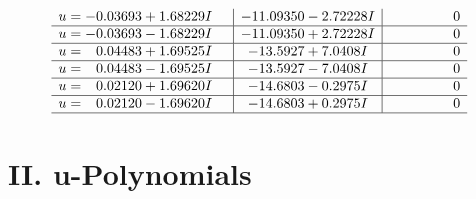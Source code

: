 \documentclass[1p]{elsarticle_modified}
\theoremstyle{definition}
\begin{document}
$$\begin{array}{c|c|c}
\begin{aligned}
u &= -0.03693 + 1.68229 I\end{aligned}
 & -11.09350 - 2.72228 I & \phantom{-0.000000 } 0 \\ \hline\begin{aligned}
u &= -0.03693 - 1.68229 I\end{aligned}
 & -11.09350 + 2.72228 I & \phantom{-0.000000 } 0 \\ \hline\begin{aligned}
u &= \phantom{-}0.04483 + 1.69525 I\end{aligned}
 & -13.5927 + 7.0408 I & \phantom{-0.000000 } 0 \\ \hline\begin{aligned}
u &= \phantom{-}0.04483 - 1.69525 I\end{aligned}
 & -13.5927 - 7.0408 I & \phantom{-0.000000 } 0 \\ \hline\begin{aligned}
u &= \phantom{-}0.02120 + 1.69620 I\end{aligned}
 & -14.6803 - 0.2975 I & \phantom{-0.000000 } 0 \\ \hline\begin{aligned}
u &= \phantom{-}0.02120 - 1.69620 I\end{aligned}
 & -14.6803 + 0.2975 I & \phantom{-0.000000 } 0\\
 \hline 
 \end{array}$$\newpage
\newpage\renewcommand{\arraystretch}{1}
\centering \section*{ II. u-Polynomials}
\end{document}
